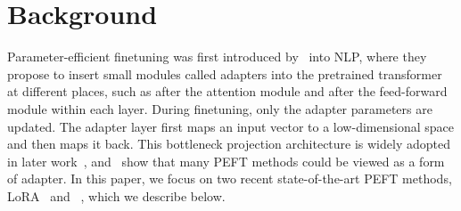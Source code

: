 
\section{Background}
\label{sec:background}


Parameter-efficient finetuning was first introduced by~\citet{houlsby2019parameter} into NLP, where they propose to insert small modules called adapters into the pretrained transformer~\citep{attention_transformer} at different places, such as after the attention module and after the feed-forward module within each layer. 
During finetuning, only the adapter parameters are updated.
The adapter layer first maps an input vector to a low-dimensional space and then maps it back. 
This bottleneck projection architecture is widely adopted in later work~\citep{pfeiffer2021adapterfusion,NEURIPS2021_081be9fd,hu2021lora},
and~\citet{he2021towards} show that many PEFT methods could be viewed as a form of adapter. 
In this paper, we focus on two recent state-of-the-art PEFT methods, LoRA~\citep{hu2021lora} and \ia~\citep{liu2022few}, which we describe below.

